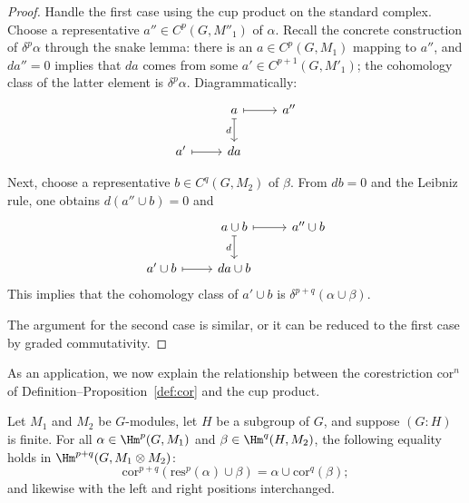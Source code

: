 \begin{proof}
	Handle the first case using the cup product on the standard complex. Choose
	a representative $a''\in C^p(G,M''_1)$ of $\alpha$. Recall the concrete
	construction of $\delta^p\alpha$ through the snake lemma: there is an
	$a\in C^p(G,M_1)$ mapping to $a''$, and $da''=0$ implies that $da$ comes
	from some $a'\in C^{p+1}(G,M'_1)$; the cohomology class of the latter
	element is $\delta^p\alpha$. Diagrammatically:
	\[\begin{tikzcd}
		& a \arrow[mapsto, r] \arrow[mapsto, d, "d"'] & a'' \\
		a' \arrow[mapsto, r] & da &
	\end{tikzcd}\]

	Next, choose a representative $b\in C^q(G,M_2)$ of $\beta$. From $db=0$
	and the Leibniz rule, one obtains $d(a''\cup b)=0$ and
	\[\begin{tikzcd}
		& a \cup b \arrow[mapsto, r] \arrow[mapsto, d, "d"'] & a'' \cup b \\
		a' \cup b \arrow[mapsto, r] & da \cup b &
	\end{tikzcd}\]
	This implies that the cohomology class of $a'\cup b$ is
	$\delta^{p+q}(\alpha\cup\beta)$.

	The argument for the second case is similar, or it can be reduced to the
	first case by graded commutativity.
\end{proof}

As an application, we now explain the relationship between the
corestriction $\mathrm{cor}^n$ of
Definition--Proposition~\ref{def:cor} and the cup product.

\begin{proposition}
	Let $M_1$ and $M_2$ be $G$-modules, let $H$ be a subgroup of $G$, and
	suppose $(G:H)$ is finite. For all $\alpha\in\Hm^p(G,M_1)$ and
	$\beta\in\Hm^q(H,M_2)$, the following equality holds in
	$\Hm^{p+q}(G,M_1\otimes M_2)$:
	\begin{equation*}
		\mathrm{cor}^{p+q}(\mathrm{res}^p(\alpha) \cup \beta) = \alpha \cup \mathrm{cor}^q(\beta);
	\end{equation*}
	and likewise with the left and right positions interchanged.
\end{proposition}

